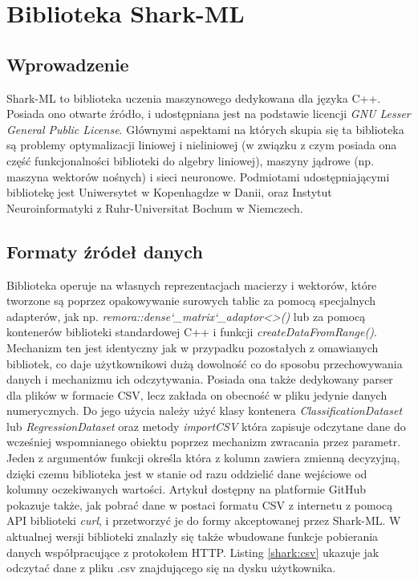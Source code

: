 \chapter{Biblioteka Shark-ML}

\section{Wprowadzenie}

Shark-ML to biblioteka uczenia maszynowego dedykowana dla języka C++. Posiada ono otwarte źródło, i udostępniana jest na podstawie licencji \textit{GNU Lesser General Public License}. Głównymi aspektami na których skupia się ta biblioteka są problemy optymalizacji liniowej i nieliniowej (w związku z czym posiada ona część funkcjonalności biblioteki do algebry liniowej), maszyny jądrowe (np. maszyna wektorów nośnych) i sieci neuronowe. \cite{shark} Podmiotami udostępniającymi bibliotekę jest Uniwersytet w Kopenhagdze w Danii, oraz Instytut Neuroinformatyki z Ruhr-Universitat Bochum w Niemczech.

\section{Formaty źródeł danych}

Biblioteka operuje na własnych reprezentacjach macierzy i wektorów, które tworzone są poprzez opakowywanie surowych tablic za pomocą specjalnych adapterów, jak np. \textit{remora::dense\char`_matrix\char`_adaptor<>()} lub za pomocą kontenerów biblioteki standardowej C++ i funkcji \textit{createDataFromRange()}. Mechanizm ten jest identyczny jak w przypadku pozostałych z omawianych bibliotek, co daje użytkownikowi dużą dowolność co do sposobu przechowywania danych i mechanizmu ich odczytywania. Posiada ona także dedykowany parser dla plików w formacie CSV, lecz zakłada on obecność w pliku jedynie danych numerycznych. Do jego użycia należy użyć klasy kontenera \textit{ClassificationDataset} lub \textit{RegressionDataset} oraz metody \textit{importCSV} która zapisuje odczytane dane do wcześniej wspomnianego obiektu poprzez mechanizm zwracania przez parametr. Jeden z argumentów funkcji określa która z kolumn zawiera zmienną decyzyjną, dzięki czemu biblioteka jest w stanie od razu oddzielić dane wejściowe od kolumny oczekiwanych wartości. Artykuł \cite{shark:http} dostępny na platformie GitHub pokazuje także, jak pobrać dane w postaci formatu CSV z internetu z pomocą API biblioteki \textit{curl}, i przetworzyć je do formy akceptowanej przez Shark-ML. W aktualnej wersji biblioteki znalazły się także wbudowane funkcje pobierania danych współpracujące z protokołem HTTP. Listing \ref{shark:csv} ukazuje jak odczytać dane z pliku .csv znajdującego się na dysku użytkownika.

